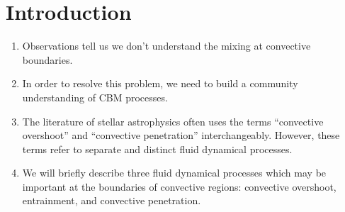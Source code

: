 \section{Introduction}
\label{sec:introduction}

\begin{enumerate}
\item Observations tell us we don't understand the mixing at convective boundaries.
\item In order to resolve this problem, we need to build a community understanding of CBM processes.
\item The literature of stellar astrophysics often uses the terms ``convective overshoot'' and ``convective penetration'' interchangeably.
However, these terms refer to separate and distinct fluid dynamical processes.
\item We will briefly describe three fluid dynamical processes which may be important at the boundaries of convective regions: convective overshoot, entrainment, and convective penetration.
\end{enumerate}

